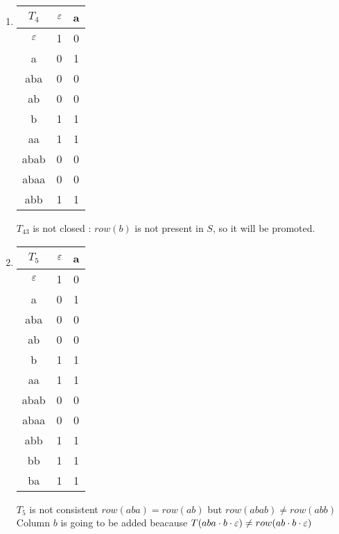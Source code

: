 \begin{enumerate}
  \item \begin{minipage}{0.3\textwidth}
          \begin{tabular}{c||c|c}
            $T_4$ & $\varepsilon$ & a \\
            \hline\hline
            $\varepsilon$  & 1    & 0 \\
            a     & 0    & 1 \\
            aba   & 0    & 0 \\
            ab    & 0    & 0 \\
            \hline\hline
            b     & 1    & 1 \\
            aa    & 1    & 1 \\
            abab  & 0    & 0 \\
            abaa  & 0    & 0 \\
            abb   & 1    & 1 \\
          \end{tabular}
        \end{minipage} \quad
        \begin{minipage}{0.5\textwidth}
          $T_43$ is not closed : $row(b)$ is not present in $S$, so it will be promoted.
        \end{minipage}

  \item \begin{minipage}{0.3\textwidth}
          \begin{tabular}{c||c|c}
            $T_5$ & $\varepsilon$ & a \\
            \hline\hline
            $\varepsilon$  & 1    & 0 \\
            a     & 0    & 1 \\
            aba   & 0    & 0 \\
            ab    & 0    & 0 \\
            b     & 1    & 1 \\
            \hline\hline
            aa    & 1    & 1 \\
            abab  & 0    & 0 \\
            abaa  & 0    & 0 \\
            abb   & 1    & 1 \\
            bb    & 1    & 1 \\
            ba    & 1    & 1 \\
          \end{tabular}
        \end{minipage} \quad
        \begin{minipage}{0.5\textwidth}
          $T_5$ is not consistent $row(aba) = row(ab)$ but $row(abab) \neq row(abb)$
          Column $b$ is going to be added beacause $T(aba \cdot b \cdot \varepsilon) \neq row(ab \cdot b \cdot \varepsilon)$
        \end{minipage}


\end{enumerate}
